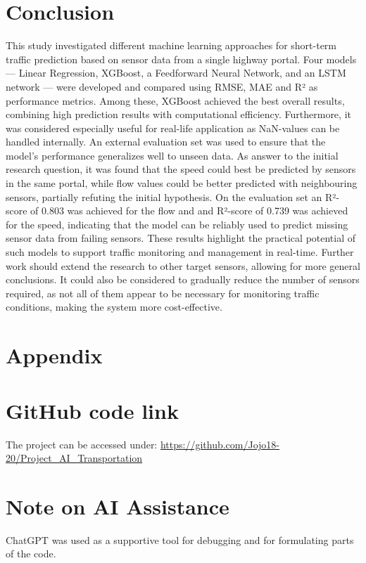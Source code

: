 	\section{Conclusion}
	This study investigated different machine learning approaches for short-term traffic prediction based on sensor data from a single highway portal. Four models — Linear Regression, XGBoost, a Feedforward Neural Network, and an LSTM network — were developed and compared using RMSE, MAE and R² as performance metrics. Among these, XGBoost achieved the best overall results, combining high prediction results with computational efficiency. Furthermore, it was considered especially useful for real-life application as NaN-values can be handled internally. An external evaluation set was used to ensure that the model’s performance generalizes well to unseen data. \newline
	As answer to the initial research question, it was found that the speed could best be predicted by sensors in the same portal, while flow values could be better predicted with neighbouring sensors, partially refuting the initial hypothesis. On the evaluation set an R²-score of 0.803 was achieved for the flow and and R²-score of 0.739 was achieved for the speed, indicating that the model can be reliably used to predict missing sensor data from failing sensors. These results highlight the practical potential of such models to support traffic monitoring and management in real-time. Further work should extend the research to other target sensors, allowing for more general conclusions. It could also be considered to gradually reduce the number of sensors required, as not all of them appear to be necessary for monitoring traffic conditions, making the system more cost-effective.
	
	
	
	
	\newpage
	\appendix
	\section*{Appendix}
	\section{GitHub code link}
	The project can be accessed under:
	\url{https://github.com/Jojo18-20/Project_AI_Transportation}
	\section{Note on AI Assistance}
	ChatGPT was used as a supportive tool for debugging and for formulating parts of the code.
